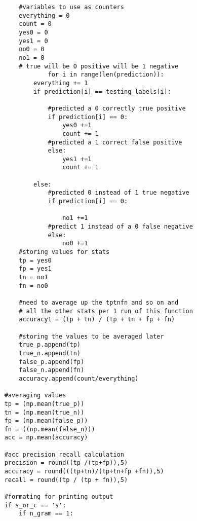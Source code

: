 \documentclass[12pt]{article}
\begin{document}
\begin{enumerate}
\begin{flushleft}
\begin{lstlisting}
        #variables to use as counters
        everything = 0
        count = 0
        yes0 = 0
        yes1 = 0
        no0 = 0
        no1 = 0
        # true will be 0 positive will be 1 negative
                for i in range(len(prediction)):
            everything += 1
            if prediction[i] == testing_labels[i]:

                #predicted a 0 correctly true positive
                if prediction[i] == 0:
                    yes0 +=1
                    count += 1
                #predicted a 1 correct false positive
                else:
                    yes1 +=1
                    count += 1

            else:
                #predicted 0 instead of 1 true negative
                if prediction[i] == 0:

                    no1 +=1
                #predict 1 instead of a 0 false negative
                else:
                    no0 +=1
        #storing values for stats
        tp = yes0
        fp = yes1
        tn = no1
        fn = no0

        #need to average up the tptnfn and so on and 
        # all the other stats per 1 run of this function
        accuracy1 = (tp + tn) / (tp + tn + fp + fn)

        #storing the values to be averaged later
        true_p.append(tp)
        true_n.append(tn)
        false_p.append(fp)
        false_n.append(fn)
        accuracy.append(count/everything)

    #averaging values
    tp = (np.mean(true_p))
    tn = (np.mean(true_n))
    fp = (np.mean(false_p))
    fn = ((np.mean(false_n)))
    acc = np.mean(accuracy)

    #acc precision recall calculation
    precision = round((tp /(tp+fp)),5)
    accuracy = round(((tp+tn)/(tp+tn+fp +fn)),5)
    recall = round((tp / (tp + fn)),5)

    #formating for printing output
    if s_or_c == 's':
        if n_gram == 1:


\end{lstlisting}
\end{flushleft}
\end{enumerate}
\end{document}
